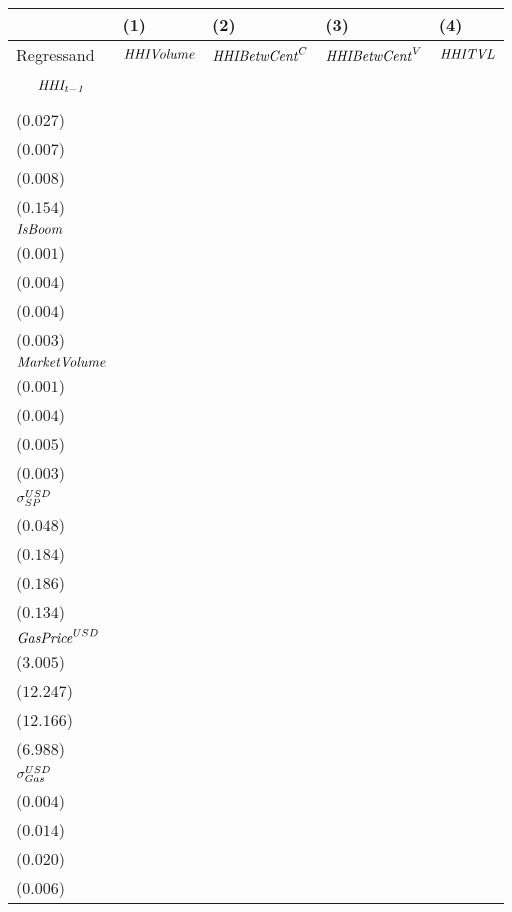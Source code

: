 \begin{tabular}{lllll}
\toprule
{} &                                     (1) &                                    (2) &                                    (3) &                                      (4) \\
\midrule
Regressand                 &                       ${\it HHIVolume}$ &                  ${\it HHIBetwCent}^C$ &                  ${\it HHIBetwCent}^V$ &                           ${\it HHITVL}$ \\
$$\it HHI_{t-1}$$          &   \makecell{$0.798^{***}$ \\ ($0.027$)} &  \makecell{$0.962^{***}$ \\ ($0.007$)} &  \makecell{$0.957^{***}$ \\ ($0.008$)} &    \makecell{$0.546^{***}$ \\ ($0.154$)} \\
${\it IsBoom}$             &  \makecell{$-0.004^{***}$ \\ ($0.001$)} &  \makecell{$0.013^{***}$ \\ ($0.004$)} &  \makecell{$0.017^{***}$ \\ ($0.004$)} &    \makecell{$0.009^{***}$ \\ ($0.003$)} \\
${\it MarketVolume}$       &   \makecell{$-0.002^{**}$ \\ ($0.001$)} &     \makecell{$0.000^{}$ \\ ($0.004$)} &    \makecell{$-0.001^{}$ \\ ($0.005$)} &    \makecell{$-0.005^{**}$ \\ ($0.003$)} \\
${\it \sigma}^{USD}_{SP}$  &     \makecell{$-0.010^{}$ \\ ($0.048$)} &    \makecell{$-0.134^{}$ \\ ($0.184$)} &    \makecell{$-0.150^{}$ \\ ($0.186$)} &   \makecell{$-0.546^{***}$ \\ ($0.134$)} \\
${\it GasPrice}^{USD}$     &     \makecell{$-3.508^{}$ \\ ($3.005$)} &   \makecell{$13.792^{}$ \\ ($12.247$)} &    \makecell{$5.810^{}$ \\ ($12.166$)} &  \makecell{$-23.044^{***}$ \\ ($6.988$)} \\
${\it \sigma}_{Gas}^{USD}$ &  \makecell{$-0.011^{***}$ \\ ($0.004$)} &     \makecell{$0.006^{}$ \\ ($0.014$)} &     \makecell{$0.005^{}$ \\ ($0.020$)} &       \makecell{$0.002^{}$ \\ ($0.006$)} \\

\end{tabular}
